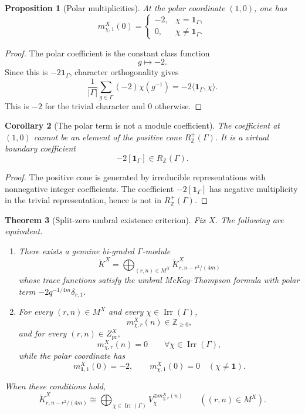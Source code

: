 \documentclass[11pt]{article}
\newtheorem{theorem}{Theorem}[section]
\newtheorem{proposition}[theorem]{Proposition}
\newtheorem{corollary}[theorem]{Corollary}
\newcommand{\ZZ}{\mathbb Z}
\newcommand{\Irr}{\operatorname{Irr}}
\newcommand{\one}{\mathbf 1}
\begin{document}
\begin{proposition}[Polar multiplicities]
At the polar coordinate \((1,0)\), one has
\[
m^X_{\chi,1}(0)=
\begin{cases}
-2,&\chi=\one_\Gamma,\\
0,&\chi\ne\one_\Gamma.
\end{cases}
\]
\end{proposition}

\begin{proof}
The polar coefficient is the constant class function
\[
g\mapsto -2.
\]
Since this is \(-2\one_\Gamma\), character orthogonality gives
\[
\frac1{|\Gamma|}\sum_{g\in\Gamma}(-2)\chi(g^{-1})=-2\langle\one_\Gamma,\chi\rangle.
\]
This is \(-2\) for the trivial character and \(0\) otherwise.
\end{proof}

\begin{corollary}[The polar term is not a module coefficient]
The coefficient at \((1,0)\) cannot be an element of the positive cone \(R_\ZZ^+(\Gamma)\).  It is a virtual boundary coefficient
\[
-2[\one_\Gamma]\in R_\ZZ(\Gamma).
\]
\end{corollary}

\begin{proof}
The positive cone is generated by irreducible representations with nonnegative integer coefficients.  The coefficient \(-2[\one_\Gamma]\) has negative multiplicity in the trivial representation, hence is not in \(R_\ZZ^+(\Gamma)\).
\end{proof}

\begin{theorem}[Split-zero umbral existence criterion]
Fix \(X\).  The following are equivalent.

\begin{enumerate}[label=(\roman*)]
\item There exists a genuine bi-graded \(\Gamma\)-module
\[
\check K^X=\bigoplus_{(r,n)\in M^X}\check K^X_{r,n-r^2/(4m)}
\]
whose trace functions satisfy the umbral McKay-Thompson formula with polar term \(-2q^{-1/4m}\delta_{r,1}\).

\item For every \((r,n)\in M^X\) and every \(\chi\in\Irr(\Gamma)\),
\[
m^X_{\chi,r}(n)\in\ZZ_{\ge0},
\]
and for every \((r,n)\in Z^X_{\mathrm{pr}}\),
\[
m^X_{\chi,r}(n)=0\qquad\forall\chi\in\Irr(\Gamma),
\]
while the polar coordinate has
\[
m^X_{\one,1}(0)=-2,
\qquad
m^X_{\chi,1}(0)=0\quad(\chi\ne\one).
\]
\end{enumerate}

When these conditions hold,
\[
\check K^X_{r,n-r^2/(4m)}
\cong
\bigoplus_{\chi\in\Irr(\Gamma)}V_\chi^{\oplus m^X_{\chi,r}(n)}
\qquad((r,n)\in M^X).
\]
\end{theorem}
\end{document}

